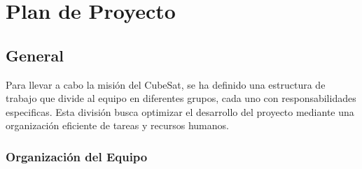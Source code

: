 \section{Plan de Proyecto}

  \subsection{General}
    Para llevar a cabo la misión del CubeSat, se ha definido una estructura de trabajo que
    divide al equipo en diferentes grupos, cada uno con responsabilidades especificas. Esta división
    busca optimizar el desarrollo del proyecto mediante una organización eficiente de tareas y
    recursos humanos.
    \subsubsection{Organización del Equipo}
